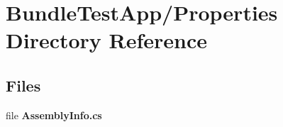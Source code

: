 \section{Bundle\+Test\+App/\+Properties Directory Reference}
\label{dir_f9afe12ac17fb2725a1d4ef426edad9d}
\subsection*{Files}
\begin{DoxyCompactItemize}
\item 
file {\bfseries Assembly\+Info.\+cs}
\end{DoxyCompactItemize}
